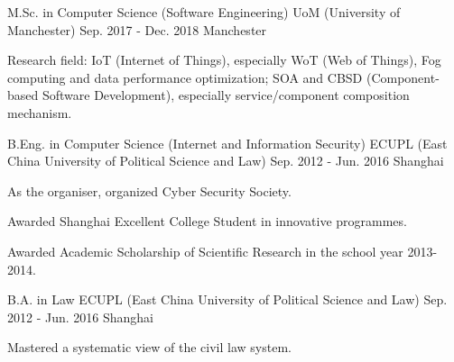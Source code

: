 \begin{cventries}
  \cventry
    {M.Sc. in Computer Science (Software Engineering)}
    {UoM (University of Manchester)}
    {Sep. 2017 - Dec. 2018}
    {Manchester}
    {
      \begin{cvitems}
        \item {Research field: IoT (Internet of Things), especially WoT (Web of Things), Fog computing and data performance optimization; SOA and CBSD (Component-based Software Development), especially service/component composition mechanism.}
      \end{cvitems}
    }
    
  \cventry
    {B.Eng. in Computer Science (Internet and Information Security)}
    {ECUPL (East China University of Political Science and Law)}
    {Sep. 2012 - Jun. 2016}
    {Shanghai}
    {
      \begin{cvitems}
        \item {As the organiser, organized Cyber Security Society.}
        \item {Awarded Shanghai Excellent College Student in innovative programmes.}
        \item {Awarded Academic Scholarship of Scientific Research in the school year 2013-2014.}
      \end{cvitems}
    }
    
  \cventry
    {B.A. in Law}
    {ECUPL (East China University of Political Science and Law)}
    {Sep. 2012 - Jun. 2016}
    {Shanghai}
    {
      \begin{cvitems}
        \item {Mastered a systematic view of the civil law system.}
      \end{cvitems}
    }
\end{cventries}
